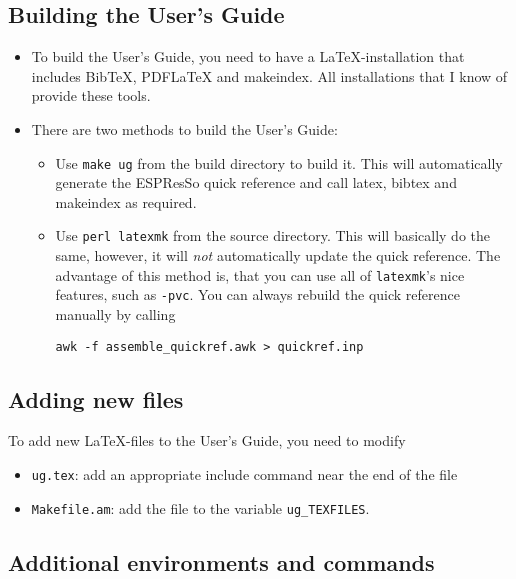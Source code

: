 \documentclass[
a4paper,                        %
11pt,                           %
twoside,                        %
footsepline,                    %
headsepline,                    %
headexclude,                    %
footexclude,                    %
pagesize,                       %
bibtotocnumbered,               %
idxtotoc                        %
]{scrreprt}
\newcommand{\es}{\mbox{\textsf{ESPResSo}}\xspace}
\begin{document}
\subsection{Building the User's Guide}
\begin{itemize}
\item To build the User's Guide, you need to have a \LaTeX-installation
  that includes BibTeX, PDFLaTeX and makeindex. All installations that
  I know of provide these tools.
\item There are two methods to build the User's Guide:
  \begin{itemize}
  \item Use \texttt{make ug} from the build directory to build
    it. This will automatically generate the \es quick reference
    and call latex, bibtex and makeindex as required.
  \item Use \texttt{perl latexmk} from the source directory. This will
    basically do the same, however, it will \emph{not} automatically
    update the quick reference. The advantage of this method is, that
    you can use all of \texttt{latexmk}'s nice features, such as
    \texttt{-pvc}. You can always rebuild the quick reference manually
    by calling 
    \begin{verbatim}
awk -f assemble_quickref.awk > quickref.inp
    \end{verbatim}
  \end{itemize}
\end{itemize}

\subsection{Adding new files}

To add new \LaTeX-files to the User's Guide, you need to modify
\begin{itemize}
\item \texttt{ug.tex}: add an appropriate include command near the end
  of the file
\item \texttt{Makefile.am}: add the file to the variable
  \texttt{ug\_TEXFILES}. 
\end{itemize}

\subsection{Additional environments and commands}
\end{document}
